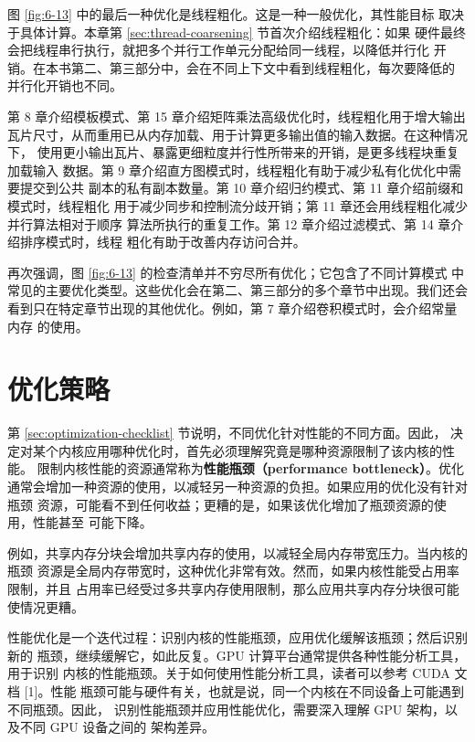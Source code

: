 图 \ref{fig:6-13} 中的最后一种优化是线程粗化。这是一种一般优化，其性能目标
取决于具体计算。本章第 \ref{sec:thread-coarsening} 节首次介绍线程粗化：如果
硬件最终会把线程串行执行，就把多个并行工作单元分配给同一线程，以降低并行化
开销。在本书第二、第三部分中，会在不同上下文中看到线程粗化，每次要降低的
并行化开销也不同。

第 8 章介绍模板模式、第 15 章介绍矩阵乘法高级优化时，线程粗化用于增大输出
瓦片尺寸，从而重用已从内存加载、用于计算更多输出值的输入数据。在这种情况下，
使用更小输出瓦片、暴露更细粒度并行性所带来的开销，是更多线程块重复加载输入
数据。第 9 章介绍直方图模式时，线程粗化有助于减少私有化优化中需要提交到公共
副本的私有副本数量。第 10 章介绍归约模式、第 11 章介绍前缀和模式时，线程粗化
用于减少同步和控制流分歧开销；第 11 章还会用线程粗化减少并行算法相对于顺序
算法所执行的重复工作。第 12 章介绍过滤模式、第 14 章介绍排序模式时，线程
粗化有助于改善内存访问合并。

再次强调，图 \ref{fig:6-13} 的检查清单并不穷尽所有优化；它包含了不同计算模式
中常见的主要优化类型。这些优化会在第二、第三部分的多个章节中出现。我们还会
看到只在特定章节出现的其他优化。例如，第 7 章介绍卷积模式时，会介绍常量内存
的使用。

\section{优化策略}
\label{sec:optimization-strategy}

第 \ref{sec:optimization-checklist} 节说明，不同优化针对性能的不同方面。因此，
决定对某个内核应用哪种优化时，首先必须理解究竟是哪种资源限制了该内核的性能。
限制内核性能的资源通常称为\textbf{性能瓶颈（performance bottleneck）}。优化
通常会增加一种资源的使用，以减轻另一种资源的负担。如果应用的优化没有针对瓶颈
资源，可能看不到任何收益；更糟的是，如果该优化增加了瓶颈资源的使用，性能甚至
可能下降。

例如，共享内存分块会增加共享内存的使用，以减轻全局内存带宽压力。当内核的瓶颈
资源是全局内存带宽时，这种优化非常有效。然而，如果内核性能受占用率限制，并且
占用率已经受过多共享内存使用限制，那么应用共享内存分块很可能使情况更糟。

性能优化是一个迭代过程：识别内核的性能瓶颈，应用优化缓解该瓶颈；然后识别新的
瓶颈，继续缓解它，如此反复。GPU 计算平台通常提供各种性能分析工具，用于识别
内核的性能瓶颈。关于如何使用性能分析工具，读者可以参考 CUDA 文档 [1]。性能
瓶颈可能与硬件有关，也就是说，同一个内核在不同设备上可能遇到不同瓶颈。因此，
识别性能瓶颈并应用性能优化，需要深入理解 GPU 架构，以及不同 GPU 设备之间的
架构差异。

